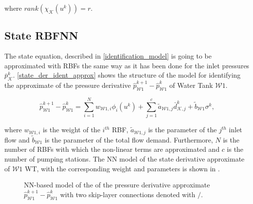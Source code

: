\vspace{-3mm}

where $rank(\chi_{\mathcal{K}}(u^k)) = r$. 

 \subsection{State RBFNN}
\label{state_rbfnn}

The state equation, described in \eqref{identification_model} is going to be approximated with RBFs the same way as it has been done for the inlet pressures $\bar{p}^{k}_{\mathcal{K}}$. \eqref{state_der_ident_approx} shows the structure of the model for identifying the approximate of the pressure derivative $\hat{p}^{k+1}_{\mathcal{W}1} \!-\! \hat{p}^{k}_{\mathcal{W}1}$ of Water Tank $\mathcal{W}1$.

\vspace{-2mm}

\begin{equation}
\label{state_der_ident_approx}
\hat{p}^{k+1}_{\mathcal{W}1} \!-\! \hat{p}^{k}_{\mathcal{W}1} = \sum_{i = 1}^N w_{\mathcal{W}1,i} \phi_i(u^{k}) + \sum_{j = 1}^c \tilde{a}_{\mathcal{W}1,j} \bar{d}^{k}_{\mathcal{K},j} + \tilde{b}_{\mathcal{W}1} \sigma^{k},
\end{equation}

where $w_{\mathcal{W}1,i}$ is the weight of the $i^{th}$ RBF, $\tilde{a}_{\mathcal{W}1,j}$ is the parameter of the $j^{th}$ inlet flow and $\tilde{b}_{\mathcal{W}1}$ is the parameter of the total flow demand. Furthermore, $N$ is the number of RBFs with which the non-linear terms are approximated and $c$ is the number of pumping stations. The NN model of the state derivative approximate of $\mathcal{W}1$ WT, with the corresponding weight and parameters is shown in .

 \begin{figure}[H]
 \centering
 \hspace*{1.7cm} 
  \vspace{-3mm}
  \caption{NN-based model of the of the pressure derivative approximate $\hat{p}^{k+1}_{\mathcal{W}1} \!-\! \hat{p}^{k}_{\mathcal{W}1}$ with two skip-layer connections denoted with $/$.}
 \label{fig:nn_state}
 \end{figure}

 \vspace{-3mm}

